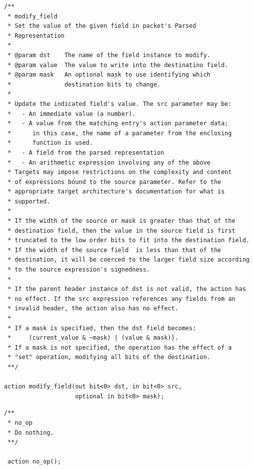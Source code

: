 \documentclass[12pt]{article}
\begin{document}
\begin{lstlisting}[style=P4style]
/**
 * modify_field
 * Set the value of the given field in packet's Parsed
 * Representation
 * 
 * @param dst    The name of the field instance to modify.
 * @param value  The value to write into the destinatino field.
 * @param mask   An optional mask to use identifying which
 *               destination bits to change.
 * 
 * Update the indicated field's value. The src parameter may be:
 *   - An immediate value (a number).
 *   - A value from the matching entry's action parameter data;
 *      in this case, the name of a parameter from the enclosing
 *      function is used.
 *   - A field from the parsed representation
 *   - An arithmetic expression involving any of the above
 * Targets may impose restrictions on the complexity and content
 * of expressions bound to the source parameter. Refer to the
 * appropriate target architecture's documentation for what is
 * supported.
 *
 * If the width of the source or mask is greater than that of the
 * destination field, then the value in the source field is first
 * truncated to the low order bits to fit into the destination field.
 * If the width of the source field  is less than that of the
 * destination, it will be coerced to the larger field size according
 * to the source expression's signedness.
 *
 * If the parent header instance of dst is not valid, the action has
 * no effect. If the src expression references any fields from an
 * invalid header, the action also has no effect.
 *
 * If a mask is specified, then the dst field becomes:
 *     (current_value & ~mask) | (value & mask)}. 
 * If a mask is not specified, the operation has the effect of a
 * "set" operation, modifying all bits of the destination.
 **/

action modify_field(out bit<0> dst, in bit<0> src,
                    optional in bit<0> mask);

\end{lstlisting}


\begin{lstlisting}[style=P4style]
/**
 * no_op
 * Do nothing.
 **/

 action no_op();

\end{lstlisting}
\end{document}
